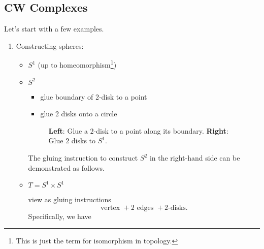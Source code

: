 \subsection{CW Complexes}
\begin{eg}
	Let's start with a few examples.
	\begin{enumerate}
		\item Constructing spheres:
		      \begin{itemize}
			      \item \(S^1\) (up to homeomorphism\footnote{This is just the term for isomorphism in topology.})
			            \begin{figure}[H]
				            \centering
				            \label{fig:eg:constructing-sphere-1}
			            \end{figure}
			      \item \(S^2\)
			            \begin{itemize}
				            \item glue boundary of 2-disk to a point
				            \item glue 2 disks onto a circle
			            \end{itemize}
			            \begin{figure}[H]
				            \centering
				            \caption{\textbf{Left}: Glue a \(2\)-disk to a point along its boundary. \textbf{Right}: Glue \(2\) disks to \(S^1\).}
				            \label{fig:eg:constructing-sphere-2}
			            \end{figure}
			            The gluing instruction to construct \(S^2\) in the right-hand side can be demonstrated as follows.
			            \begin{figure}[H]
				            \centering
				            \label{fig:eg:constructing-sphere-2-gluing-instr}
			            \end{figure}
			      \item \(T = S^1 \times S^1\)
			            \begin{figure}[H]
				            \centering
				            \label{fig:eg:constructing-torus}
			            \end{figure}
			            view as gluing instructions
			            \[
				            \text{vertex }+ 2 \text{ edges }+2\text{-disks}.
			            \]
			            Specifically, we have
			            \begin{figure}[H]
				            \centering
				            \label{fig:eg:constructing-torus-gluing-instr}
			            \end{figure}
		      \end{itemize}
	\end{enumerate}
\end{eg}

